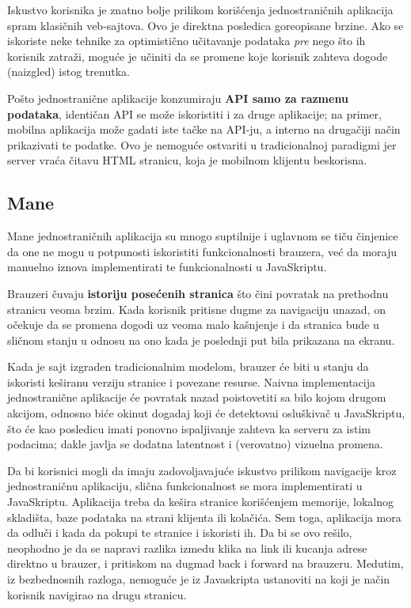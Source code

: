 Iskustvo korisnika je znatno bolje prilikom korišćenja jednostraničnih aplikacija spram klasičnih veb-sajtova.
Ovo je direktna posledica goreopisane brzine.
Ako se iskoriste neke tehnike za optimistično učitavanje podataka \textit{pre} nego što ih korisnik zatraži, moguće je učiniti da se promene koje korisnik zahteva dogode (naizgled) istog trenutka.

Pošto jednostranične aplikacije konzumiraju \textbf{API samo za razmenu podataka}, identičan API se može iskoristiti i za druge aplikacije; na primer, mobilna aplikacija može gadati iste tačke na API-ju, a interno na drugačiji način prikazivati te podatke.
Ovo je nemoguće ostvariti u tradicionalnoj paradigmi jer server vraća čitavu HTML stranicu, koja je mobilnom klijentu beskorisna.

\subsection{Mane}

Mane jednostraničnih aplikacija su mnogo suptilnije i uglavnom se tiču činjenice da one ne mogu u potpunosti iskoristiti funkcionalnosti brauzera, već da moraju manuelno iznova implementirati te funkcionalnosti u JavaSkriptu.

Brauzeri čuvaju \textbf{istoriju posećenih stranica} što čini povratak na prethodnu stranicu veoma brzim.
Kada korisnik pritisne dugme za navigaciju unazad, on očekuje da se promena dogodi uz veoma malo kašnjenje i da stranica bude u sličnom stanju u odnosu na ono kada je poslednji put bila prikazana na ekranu.

Kada je sajt izgraden tradicionalnim modelom, brauzer će biti u stanju da iskoristi keširanu verziju stranice i povezane resurse.
Naivna implementacija jednostranične aplikacije će povratak nazad poistovetiti sa bilo kojom drugom akcijom, odnosno biće okinut dogadaj koji će detektovai osluškivač u JavaSkriptu, što će kao posledicu imati ponovno ispaljivanje zahteva ka serveru za istim podacima; dakle javlja se dodatna latentnost i (verovatno) vizuelna promena.

Da bi korisnici mogli da imaju zadovoljavajuće iskustvo prilikom navigacije kroz jednostraničnu aplikaciju, slična funkcionalnost se mora implementirati u JavaSkriptu. Aplikacija treba da kešira stranice korišćenjem memorije, lokalnog skladišta, baze podataka na strani klijenta ili kolačića.
Sem toga, aplikacija mora da odluči i kada da pokupi te stranice i iskoristi ih.
Da bi se ovo rešilo, neophodno je da se napravi razlika izmedu klika na link ili kucanja adrese direktno u brauzer, i pritiskom na dugmad back i forward na brauzeru. 
Medutim, iz bezbednosnih razloga, nemoguće je iz Javaskripta ustanoviti na koji je način korisnik navigirao na drugu stranicu.

